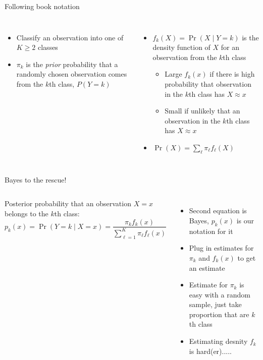 \documentclass[aspectratio=169,usenames,dvipsnames]{beamer}
\newcommand{\InstructorList}[1]{
\begin{itemize}
	\color{orange}
	#1
\end{itemize}
}
\begin{document}
\begin{frame}[c]{Following book notation}

\begin{columns}
\centering
\begin{itemize}
	\item Classify an observation into one of $K\geq 2 $ classes
	\item $\pi_k$ is the \textit{prior} probability that a randomly chosen observation comes from the $k$th class, $P(Y = k)$
\end{itemize}
\centering
\begin{itemize}
	\item $f_k(X) = \Pr(X \mid Y = k)$ is the density function of $X$ for an observation from the $k$th class

	\InstructorList{
	\item Large $f_k(x)$ if there is high probability that observation in the $k$th class has $X \approx x$
	\item Small if unlikely that an observation in the $k$th class has $X \approx x$
	}
	\item $\Pr(X) = \sum_\ell \pi_\ell f_\ell(X)$
\end{itemize}

\end{columns}

\end{frame}
\begin{frame}[c]{Bayes to the rescue!}

\begin{columns}
Posterior probability that an observation $X=x$ belongs to the $k$th class:
\begin{equation*}
	p_k(x) = \Pr(Y = k \mid X = x ) = \frac{ \pi_k f_k(x)}{\sum_{\ell = 1}^K \pi_\ell f_\ell(x)}
\end{equation*}

\centering
\InstructorList{
\item Second equation is Bayes, $p_k(x)$ is our notation for it
\item Plug in estimates for $\pi_k$ and $f_k(x)$ to get an estimate
\item Estimate for $\pi_k$ is easy with a random sample, just take proportion that are $k$th class
\item Estimating desnity $f_k$ is hard(er).....
}

\end{columns}

\end{frame}
\end{document}
